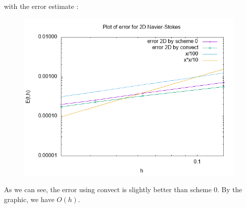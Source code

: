 \documentclass[a4paper,10pt]{article}
\begin{document}
with the error estimate :
\begin{figure}[h!]
	\centering
	\includegraphics[width=0.7\linewidth]{NS_2D/error_NS_2D}
	\caption{}
	\label{fig:errorns2d}
\end{figure}

As we can see, the error using convect is slightly better than scheme $ 0 $. By the graphic, we have $ O(h) $.
\end{document}

